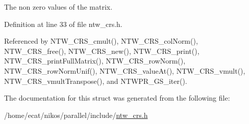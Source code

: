 The non zero values of the matrix. 

Definition at line 33 of file ntw\+\_\+crs.\+h.



Referenced by N\+T\+W\+\_\+\+C\+R\+S\+\_\+cmult(), N\+T\+W\+\_\+\+C\+R\+S\+\_\+col\+Norm(), N\+T\+W\+\_\+\+C\+R\+S\+\_\+free(), N\+T\+W\+\_\+\+C\+R\+S\+\_\+new(), N\+T\+W\+\_\+\+C\+R\+S\+\_\+print(), N\+T\+W\+\_\+\+C\+R\+S\+\_\+print\+Full\+Matrix(), N\+T\+W\+\_\+\+C\+R\+S\+\_\+row\+Norm(), N\+T\+W\+\_\+\+C\+R\+S\+\_\+row\+Norm\+Unif(), N\+T\+W\+\_\+\+C\+R\+S\+\_\+value\+At(), N\+T\+W\+\_\+\+C\+R\+S\+\_\+vmult(), N\+T\+W\+\_\+\+C\+R\+S\+\_\+vmult\+Transpose(), and N\+T\+W\+P\+R\+\_\+\+G\+S\+\_\+iter().



The documentation for this struct was generated from the following file\+:\begin{DoxyCompactItemize}
\item 
/home/ecat/nikos/parallel/include/\mbox{\hyperlink{ntw__crs_8h}{ntw\+\_\+crs.\+h}}\end{DoxyCompactItemize}
